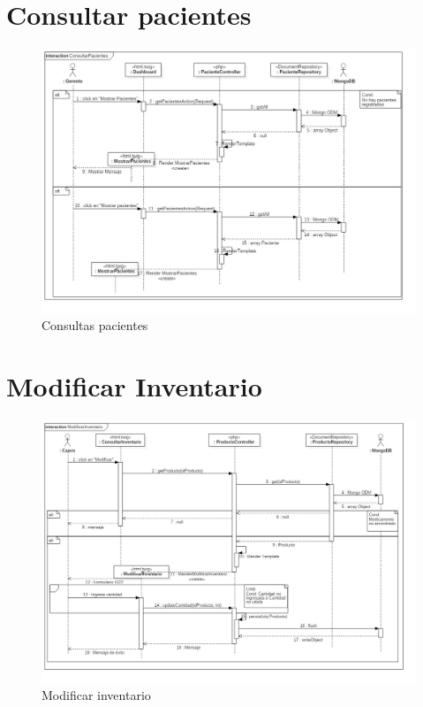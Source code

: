 \section{Consultar pacientes}
	\begin{figure}[htbp!]
		\centering
			\includegraphics[width=1\textwidth]{uml/DiagramasSecuencia/DemisGomez/consultarPacientes}
		\caption{Consultas pacientes}
	\end{figure}
	\newpage
\section{Modificar Inventario}
	\begin{figure}[htbp!]
		\centering
			\includegraphics[width=1\textwidth]{uml/DiagramasSecuencia/DemisGomez/modificarInventario}
		\caption{Modificar inventario}
	\end{figure}
	\newpage

